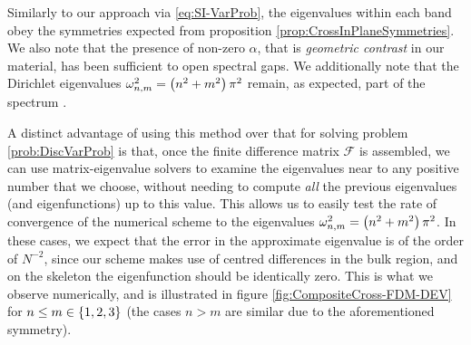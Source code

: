Similarly to our approach via \eqref{eq:SI-VarProb}, the eigenvalues within each band obey the symmetries expected from proposition \ref{prop:CrossInPlaneSymmetries}.
We also note that the presence of non-zero $\alpha$, that is \emph{geometric contrast} in our material, has been sufficient to open spectral gaps.
We additionally note that the Dirichlet eigenvalues $\omega_{n,m}^2=\left( n^2+m^2 \right)\pi^2$ remain, as expected, part of the spectrum .

A distinct advantage of using this method over that for solving problem \ref{prob:DiscVarProb} is that, once the finite difference matrix $\mathcal{F}$ is assembled, we can use matrix-eigenvalue solvers to examine the eigenvalues near to any positive number that we choose, without needing to compute \emph{all} the previous eigenvalues (and eigenfunctions) up to this value.
This allows us to easily test the rate of convergence of the numerical scheme to the eigenvalues $\omega_{n,m}^2 = \left( n^2+m^2 \right)\pi^2$.
In these cases, we expect that the error in the approximate eigenvalue is of the order of $N^{-2}$, since our scheme makes use of centred differences in the bulk region, and on the skeleton the eigenfunction should be identically zero.
This is what we observe numerically, and is illustrated in figure \ref{fig:CompositeCross-FDM-DEV} for $n\leq m\in\left\{ 1,2,3 \right\}$ (the cases $n>m$ are similar due to the aforementioned symmetry).
